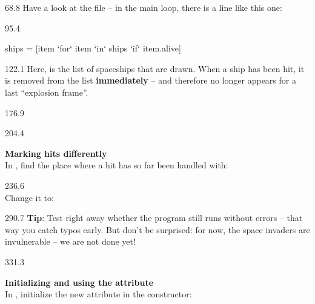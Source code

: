 \documentclass{aslab}
\newcommand*\Kw[1]{\textcolor{codeorange}{#1}}  %
\newcommand*\Cy[1]{\textcolor{codecyan}{#1}}    %
\begin{document}
\nextpage
\begin{region}[x=74.7,right=0,pitch=13.2]{68.8}
Have a look at the file  -- in the main loop, there is a
line like this one:
\end{region}

\begin{region}[x=74.7,right=0]{95.4}
\begin{codeblock}[escapechar=`]
ships = [item `\Kw{for}` item `\Kw{in}` ships `\Kw{if}` item.alive]
\end{codeblock}
\end{region}

\begin{region}[x=74.7,right=0,pitch=13.75]{122.1}
Here,  is the list of spaceships that are drawn. When a ship has
been hit, it is removed from the list \textbf{immediately} -- and therefore
no longer appears for a last ``explosion frame''.
\end{region}

\begin{region}[x=74.7,right=0]{176.9}
\end{region}

\begin{region}[x=74.7,right=0,pitch=14.2]{204.4}
\begin{boldsteps}
\item \textbf{Marking hits differently}\\
  In , find the place where a hit has so far been handled with:
\end{boldsteps}
\end{region}

\begin{region}[x=92.7,right=0,pitch=17.75]{236.6}
\tcode{s.alive = }{\ttfamily\Cy{False}}\\
Change it to:\\
\tcode{s.hit = }{\ttfamily\Cy{True}}
\end{region}

\begin{region}[x=92.7,right=0,pitch=13.2]{290.7}
\textbf{Tip}: Test right away whether the program still runs without errors
-- that way you catch typos early. But don't be surprised: for now, the space
invaders are invulnerable -- we are not done yet!
\end{region}

\begin{region}[x=74.7,right=0,pitch=13.5]{331.3}
\begin{boldsteps}[start=2]
\item \textbf{Initializing and using the 
  attribute}\\
  In , initialize the new attribute in the constructor:
\end{boldsteps}
\end{region}
\end{document}
